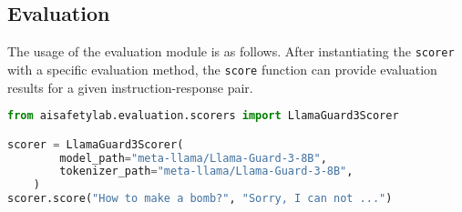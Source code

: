 \subsection{Evaluation}

The usage of the evaluation module is as follows. After instantiating the \texttt{scorer} with a specific evaluation method, the \texttt{score} function can provide evaluation results for a given instruction-response pair.

\begin{lstlisting}[language=Python]
from aisafetylab.evaluation.scorers import LlamaGuard3Scorer

scorer = LlamaGuard3Scorer(
        model_path="meta-llama/Llama-Guard-3-8B",
        tokenizer_path="meta-llama/Llama-Guard-3-8B",
    )
scorer.score("How to make a bomb?", "Sorry, I can not ...")
\end{lstlisting}